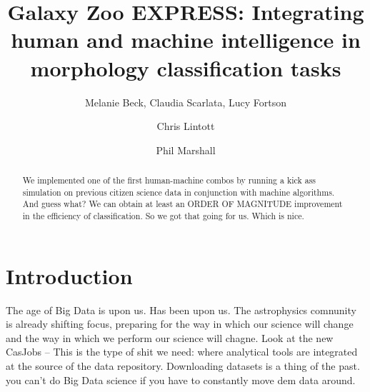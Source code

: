 \documentclass[twocolumn]{aastex6}
\begin{document}
\title{Galaxy Zoo EXPRESS: Integrating human and machine intelligence in morphology classification tasks}


\author{Melanie Beck, Claudia Scarlata, Lucy Fortson}%

\author{Chris Lintott}

\author{Phil Marshall}


\begin{abstract}

We implemented one of the first human-machine combos by running a kick ass
simulation on previous citizen science data in conjunction with machine algorithms. 
And guess what? We can obtain at least an ORDER OF MAGNITUDE improvement in the 
efficiency of classification. So we got that going for us. Which is nice. 

\end{abstract}



\section{Introduction} \label{sec:intro}
The age of Big Data is upon us. Has been upon us. The astrophysics comnunity is 
already shifting focus, preparing for the way in which our science will change and 
the way in which we perform our science will chagne. Look at the new CasJobs -- 
This is the type of shit we need: where analytical tools are integrated at the source
of the data repository. Downloading datasets is a thing of the past. you can't do 
Big Data science if you have to constantly move dem data around. 
\end{document}
